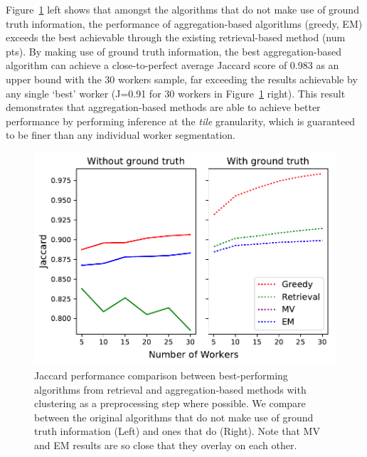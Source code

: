 Figure~\ref{retrieval_vs_aggregation} left shows that amongst the algorithms that do not make use of ground truth information, the performance of aggregation-based algorithms (greedy, EM) exceeds the best achievable through the existing retrieval-based method (num pts). By making use of ground truth information, the best aggregation-based algorithm can achieve a close-to-perfect average Jaccard score of 0.983 as an upper bound with the 30 workers sample, far exceeding the results achievable by any single `best' worker (J=0.91 for 30 workers in Figure~\ref{retrieval_vs_aggregation} right). This result demonstrates that aggregation-based methods are able to achieve better performance by performing inference at the \textit{tile} granularity, which is guaranteed to be finer than any individual worker segmentation. 
 \begin{figure}[h!]
   \centering
   \includegraphics[width=\textwidth]{plots/Retrieval_vs_Aggregation.pdf}
   \caption{Jaccard performance comparison between best-performing algorithms from retrieval and aggregation-based methods with clustering as a preprocessing step where possible. We compare between the original algorithms that do not make use of ground truth information (Left) and ones that do (Right). Note that MV and EM results are so close that they overlay on each other.}
   \label{retrieval_vs_aggregation}
 \end{figure}


